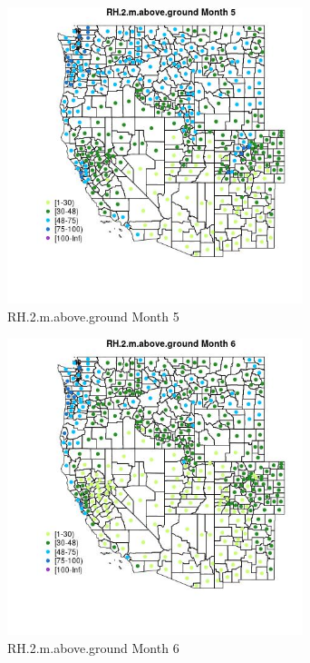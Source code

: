 \begin{figure} 
\centering  
\includegraphics[width=0.77\textwidth]{Code_Outputs/df_report_ML_predictors_CountyCentroid_Locations_Dates_2008-01-01to2018-12-31_MapObsMo5RH2maboveground.jpg} 
\caption{\label{fig:df_report_ML_predictors_CountyCentroid_Locations_Dates_2008-01-01to2018-12-31MapObsMo5RH2maboveground}RH.2.m.above.ground Month 5} 
\end{figure} 
 

\begin{figure} 
\centering  
\includegraphics[width=0.77\textwidth]{Code_Outputs/df_report_ML_predictors_CountyCentroid_Locations_Dates_2008-01-01to2018-12-31_MapObsMo6RH2maboveground.jpg} 
\caption{\label{fig:df_report_ML_predictors_CountyCentroid_Locations_Dates_2008-01-01to2018-12-31MapObsMo6RH2maboveground}RH.2.m.above.ground Month 6} 
\end{figure} 
 

